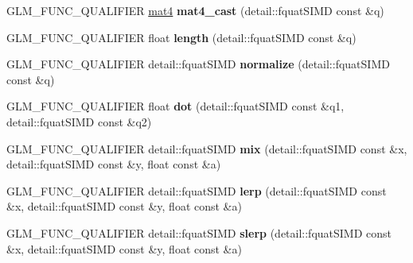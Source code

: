 \begin{DoxyCompactItemize}
\item 
G\+L\+M\+\_\+\+F\+U\+N\+C\+\_\+\+Q\+U\+A\+L\+I\+F\+I\+ER \hyperlink{group__core__types_ga7dcd2365c2e368e6af5b7adeb6a9c8df}{mat4} {\bfseries mat4\+\_\+cast} (detail\+::fquat\+S\+I\+MD const \&q)\hypertarget{namespaceglm_a350adcfec63eb015dd2d9ee14a4e8cde}{}\label{namespaceglm_a350adcfec63eb015dd2d9ee14a4e8cde}

\item 
G\+L\+M\+\_\+\+F\+U\+N\+C\+\_\+\+Q\+U\+A\+L\+I\+F\+I\+ER float {\bfseries length} (detail\+::fquat\+S\+I\+MD const \&q)\hypertarget{namespaceglm_aaa8b73fac4aaa2acdfc98adc48cd15d0}{}\label{namespaceglm_aaa8b73fac4aaa2acdfc98adc48cd15d0}

\item 
G\+L\+M\+\_\+\+F\+U\+N\+C\+\_\+\+Q\+U\+A\+L\+I\+F\+I\+ER detail\+::fquat\+S\+I\+MD {\bfseries normalize} (detail\+::fquat\+S\+I\+MD const \&q)\hypertarget{namespaceglm_a31e71acc931a3619a3305958048cfa8d}{}\label{namespaceglm_a31e71acc931a3619a3305958048cfa8d}

\item 
G\+L\+M\+\_\+\+F\+U\+N\+C\+\_\+\+Q\+U\+A\+L\+I\+F\+I\+ER float {\bfseries dot} (detail\+::fquat\+S\+I\+MD const \&q1, detail\+::fquat\+S\+I\+MD const \&q2)\hypertarget{namespaceglm_ab68375a7ad5f9dc3db97323af1326bbb}{}\label{namespaceglm_ab68375a7ad5f9dc3db97323af1326bbb}

\item 
G\+L\+M\+\_\+\+F\+U\+N\+C\+\_\+\+Q\+U\+A\+L\+I\+F\+I\+ER detail\+::fquat\+S\+I\+MD {\bfseries mix} (detail\+::fquat\+S\+I\+MD const \&x, detail\+::fquat\+S\+I\+MD const \&y, float const \&a)\hypertarget{namespaceglm_a1539ad90a9eb88f535d9dfacba04c1c9}{}\label{namespaceglm_a1539ad90a9eb88f535d9dfacba04c1c9}

\item 
G\+L\+M\+\_\+\+F\+U\+N\+C\+\_\+\+Q\+U\+A\+L\+I\+F\+I\+ER detail\+::fquat\+S\+I\+MD {\bfseries lerp} (detail\+::fquat\+S\+I\+MD const \&x, detail\+::fquat\+S\+I\+MD const \&y, float const \&a)\hypertarget{namespaceglm_a4d8cd3fe0165431fb1c54cbeb432bf26}{}\label{namespaceglm_a4d8cd3fe0165431fb1c54cbeb432bf26}

\item 
G\+L\+M\+\_\+\+F\+U\+N\+C\+\_\+\+Q\+U\+A\+L\+I\+F\+I\+ER detail\+::fquat\+S\+I\+MD {\bfseries slerp} (detail\+::fquat\+S\+I\+MD const \&x, detail\+::fquat\+S\+I\+MD const \&y, float const \&a)\hypertarget{namespaceglm_a40d5134f42aaa1511518d2abe97e0ebc}{}\label{namespaceglm_a40d5134f42aaa1511518d2abe97e0ebc}


\end{DoxyCompactItemize}
